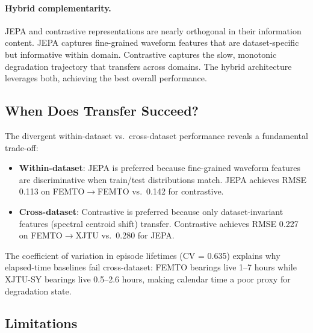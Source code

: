 \paragraph{Hybrid complementarity.} JEPA and contrastive representations are nearly orthogonal in their information content. JEPA captures fine-grained waveform features that are dataset-specific but informative within domain. Contrastive captures the slow, monotonic degradation trajectory that transfers across domains. The hybrid architecture leverages both, achieving the best overall performance.

\subsection{When Does Transfer Succeed?}
\label{sec:transfer_analysis}

The divergent within-dataset vs.\ cross-dataset performance reveals a fundamental trade-off:

\begin{itemize}[nosep]
  \item \textbf{Within-dataset}: JEPA is preferred because fine-grained waveform features are discriminative when train/test distributions match. JEPA achieves RMSE 0.113 on FEMTO$\to$FEMTO vs.\ 0.142 for contrastive.
  \item \textbf{Cross-dataset}: Contrastive is preferred because only dataset-invariant features (spectral centroid shift) transfer. Contrastive achieves RMSE 0.227 on FEMTO$\to$XJTU vs.\ 0.280 for JEPA.
\end{itemize}

The coefficient of variation in episode lifetimes (CV = 0.635) explains why elapsed-time baselines fail cross-dataset: FEMTO bearings live 1--7 hours while XJTU-SY bearings live 0.5--2.6 hours, making calendar time a poor proxy for degradation state.


\subsection{Limitations}
\label{sec:limitations}


